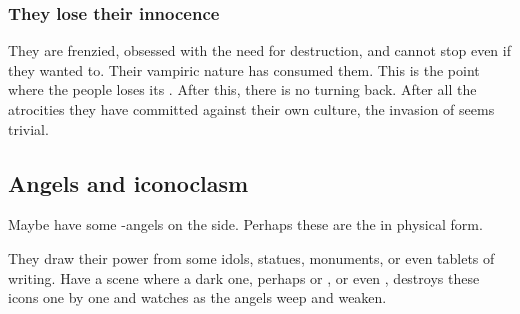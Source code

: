 




\subsubsection{They lose their innocence}
They are frenzied, obsessed with the need for destruction, and cannot stop even if they wanted to. 
Their vampiric nature has consumed them. 
This is the point where the \resphan{} people loses its . 
After this, there is no turning back. 
After all the atrocities they have committed against their own culture, the invasion of \Tembrae{} seems trivial. 










\subsection{Angels and iconoclasm}
Maybe have some \uber-angels on the \Merkyran{} side. Perhaps these are the  in physical form. 

They draw their power from some idols, statues, monuments, or even tablets of writing. Have a scene where a dark one, perhaps \Morcariel{} or \Ramiel, or even \Sithiyacaan, destroys these icons one by one and watches as the angels weep and weaken. 

